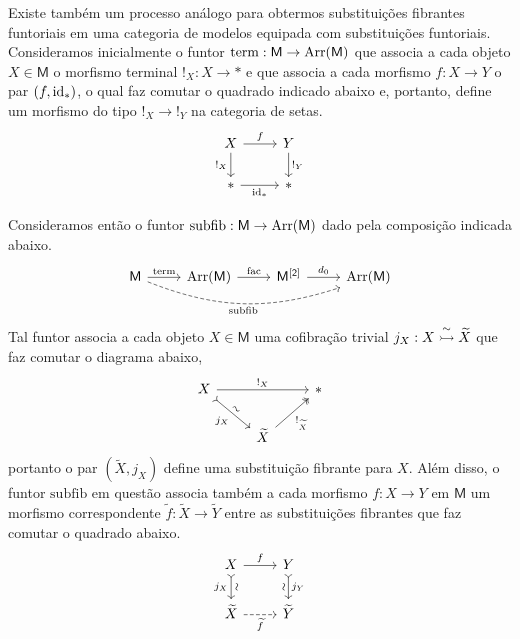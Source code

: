 \begin{obs}
  Existe também um processo análogo para obtermos substituições fibrantes funtoriais em uma categoria de modelos equipada com substituições funtoriais.
  Consideramos inicialmente o funtor $\mathrm{term}: \mathsf{M} \to \mathrm{Arr}(\mathsf{M})$ que associa a cada objeto $X \in \mathsf{M}$ o morfismo terminal $!_{X}: X \to *$ e que associa a cada morfismo $f: X \to Y$ o par $(f,\mathrm{id}_{*})$, o qual faz comutar o quadrado indicado abaixo e, portanto, define um morfismo do tipo $!_{X} \to !_{Y}$ na categoria de setas.
  \begin{displaymath}
    \begin{tikzcd}
      X
      \arrow[r, "f"]
      \arrow[d, "!_{X}" swap]
      & Y
      \arrow[d, "!_{Y}"]
      \\ *
      \arrow[r, "\id_{*}" swap]
      & *
    \end{tikzcd}
  \end{displaymath}

  Consideramos então o funtor $\mathrm{subfib}: \mathsf{M} \to \mathrm{Arr}(\mathsf{M})$ dado pela composição indicada abaixo.
  \begin{displaymath}
    \begin{tikzcd}
      \mathsf{M}
      \arrow[r, "\mathrm{term}"]
      \arrow[rrr, dashed, bend right=20, "\mathrm{subfib}" swap]
      & \Arr(\mathsf{M})
      \arrow[r, "\mathrm{fac}"]
      & \mathsf{M^{[2]}}
      \arrow[r, "d_{0}"]
      & \Arr(\mathsf{M})
    \end{tikzcd}
  \end{displaymath}
  Tal funtor associa a cada objeto $X \in \mathsf{M}$ uma cofibração trivial $j_{X}: X \overset{\sim}{\rightarrowtail} \widetilde{X}$ que faz comutar o diagrama abaixo,
  \begin{displaymath}
    \begin{tikzcd}
      X
      \arrow[rr, "!_{X}"]
      \arrow[rd, tail, "j_{X}" {swap}, "\sim" {sloped}]
      & & *
      \\ & \widetilde{X}
      \arrow[ru, two heads, "!_{\widetilde{X}}" swap]
    \end{tikzcd}
  \end{displaymath}
  portanto o par $(\widetilde{X},j_{X})$ define uma substituição fibrante para $X$.
  Além disso, o funtor $\mathrm{subfib}$ em questão associa também a cada morfismo $f: X \to Y$ em $\mathsf{M}$ um morfismo correspondente $\widetilde{f}: \widetilde{X} \to \widetilde{Y}$ entre as substituições fibrantes que faz comutar o quadrado abaixo.
  \begin{equation}\label{eq:funtorialidade_sub_fib}
    \begin{tikzcd}
      X
      \arrow[d, tail, "j_{X}" {swap}, "\sim" {sloped}]
      \arrow[r, "f"]
      & Y
      \arrow[d, tail, "j_{Y}", "\sim" {swap,sloped}]
      \\ \widetilde{X}
      \arrow[r, dashed, "\widetilde{f}" swap]
      & \widetilde{Y}
    \end{tikzcd}
  \end{equation}


\end{obs}
